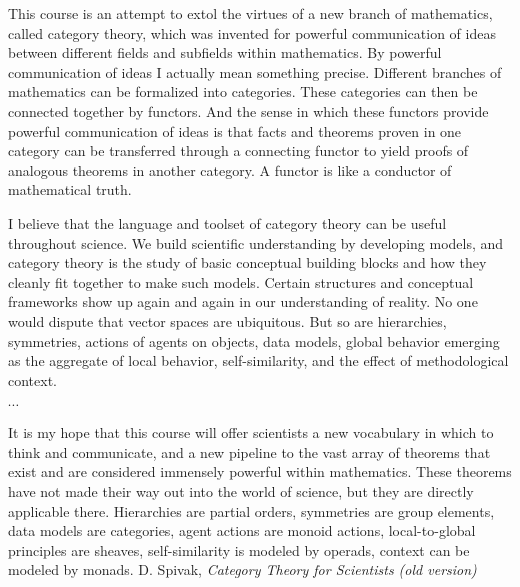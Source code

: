 \documentclass[11pt,openany]{book}
\begin{document}
\begin{boxquote}
This course is an attempt to extol the virtues of a new branch of mathematics,
called category theory, which was invented for powerful communication of ideas between
different fields and subfields within mathematics. By powerful communication of ideas I
actually mean something precise. Different branches of mathematics can be formalized
into categories. These categories can then be connected together by functors. And the
sense in which these functors provide powerful communication of ideas is that facts and
theorems proven in one category can be transferred through a connecting functor to
yield proofs of analogous theorems in another category. A functor is like a conductor of
mathematical truth.
\par
I believe that the language and toolset of category theory can be useful throughout
science. We build scientific understanding by developing models, and category theory is
the study of basic conceptual building blocks and how they cleanly fit together to make
such models. Certain structures and conceptual frameworks show up again and again in
our understanding of reality. No one would dispute that vector spaces are ubiquitous.
But so are hierarchies, symmetries, actions of agents on objects, data models, global
behavior emerging as the aggregate of local behavior, self-similarity, and the effect of
methodological context.
\par
$\cdots$
\par
It is my hope that this course will offer scientists a new vocabulary in which to think
and communicate, and a new pipeline to the vast array of theorems that exist and are
considered immensely powerful within mathematics. These theorems have not made their
way out into the world of science, but they are directly applicable there. Hierarchies are
partial orders, symmetries are group elements, data models are categories, agent actions
are monoid actions, local-to-global principles are sheaves, self-similarity is modeled by
operads, context can be modeled by monads.
\tcblower
{D. Spivak, \textit{Category Theory for Scientists 
(old version)}~\cite{spivakd_2013_cath_for_scientists}}
\end{boxquote}
\end{document}
